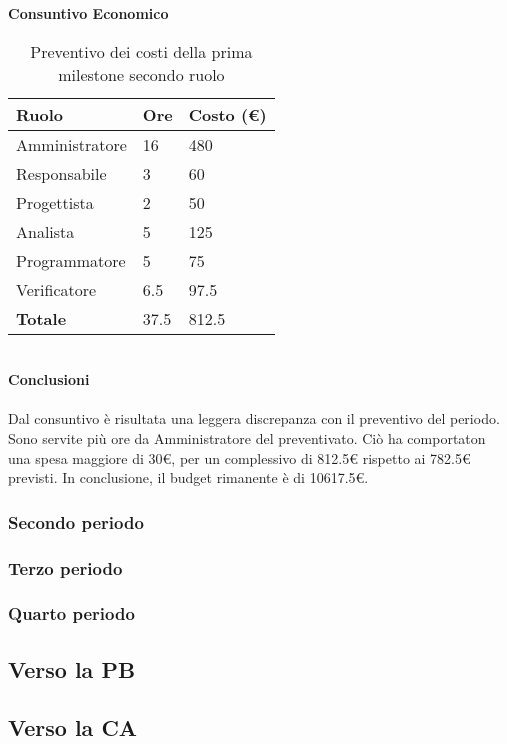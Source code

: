 \textbf{Consuntivo Economico}
\begin{table}[ht!]
	\centering
	\begin{tabular}{p{4cm} p{1cm} p{2cm}}
        \toprule
        \textbf{Ruolo} & \textbf{Ore} & \textbf{Costo (€)} \\
        \midrule
        Amministratore & 16 & 480 \\
        Responsabile & 3 & 60 \\
        Progettista & 2 & 50 \\
        Analista & 5 & 125 \\
        Programmatore & 5 & 75 \\
        Verificatore & 6.5 & 97.5 \\
        \bottomrule
        \textbf{Totale} & 37.5 & 812.5
    \end{tabular}
    \caption{Preventivo dei costi della prima milestone secondo ruolo}
	\label{table:Preventivo dei costi consuntivi della prima milestone secondo ruolo}
\end{table}
\\
\textbf{Conclusioni}
\\\\
Dal consuntivo è risultata una leggera discrepanza con il preventivo del periodo. Sono servite più ore da Amministratore del preventivato.
Ciò ha comportaton una spesa maggiore di 30€, per un complessivo di 812.5€ rispetto ai 782.5€ previsti.
In conclusione, il budget rimanente è di 10617.5€. 
\subsubsection{Secondo periodo}
\subsubsection{Terzo periodo}
\subsubsection{Quarto periodo}

\subsection{Verso la PB}

\subsection{Verso la CA}
